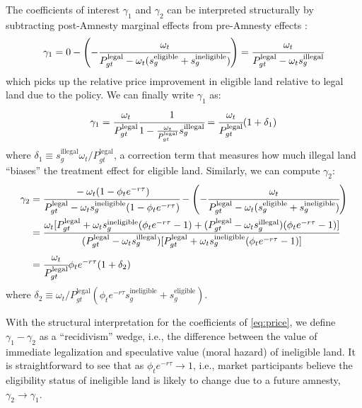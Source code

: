 \documentclass[12pt]{article}
\newcommand{\PTR}[1]{{\color{blue}{#1}}}
\begin{document}
\quad The coefficients of interest $\gamma_1$ and $\gamma_2$ can be interpreted structurally by subtracting post-Amnesty marginal effects from pre-Amnesty effects \PTR{re-write in potential outcomes formulation (average/expectation) - now it's in granular treatment assignment language (with the g's)}:
\begin{equation*}
  \gamma_1=0-\left(-\cfrac{\omega_t}{P_{gt}^\text{legal}-\omega_t(s_g^\text{eligible}+s_g^\text{ineligible})}\right)  =\cfrac{\omega_t}{P_{gt}^\text{legal}-\omega_t s_g^\text{illegal} }
\end{equation*}
which picks up the relative price improvement in eligible land relative to legal land due to the policy. We can finally write $\gamma_1$ as:
\begin{equation}
  \gamma_1=\cfrac{\omega_t}{P_{gt}^\text{legal}}\cfrac{1}{1-\frac{\omega_t}{P_{gt}^\text{legal}}s_g^\text{illegal}} =\cfrac{\omega_t}{P_{gt}^\text{legal}}(1+\delta_1) \label{eq:gamma1}
\end{equation}
where $\delta_1\equiv s_g^\text{illegal}\omega_t/P_{gt}^\text{legal}$, a correction term that measures how much illegal land ``biases'' the treatment effect for eligible land.  Similarly, we can compute $\gamma_2$:
\begin{align}
  \gamma_2 &=  \cfrac{-\omega_t(1-\phi_t e^{-r\tau})}{P_{gt}^{\text{legal}}-\omega_ts_g^\text{ineligible}(1-\phi_t e^{-r\tau})} - \left(-\cfrac{\omega_t}{P_{gt}^\text{legal}-\omega_t(s_g^\text{eligible}+s_g^\text{ineligible})}\right) \notag \\
  &=\cfrac{\omega_t[P_{gt}^\text{legal}+\omega_ts_g^\text{ineligible}(\phi_te^{-r\tau}-1)+(P_{gt}^\text{legal}-\omega_ts_g^\text{illegal})(\phi_te^{-r\tau}-1) ]}{(P_{gt}^\text{legal}-\omega_ts_g^\text{illegal})[P_{gt}^\text{legal}+\omega_t s_g^\text{ineligible}(\phi_te^{-r\tau}-1)] } \notag \\ 
  &=\cfrac{\omega_t}{P_{gt}^\text{legal}}\phi_te^{-r\tau}(1+\delta_2)
\end{align}
where $\delta_2\equiv \omega_t/P_{gt}^\text{legal}(\phi_te^{-r\tau}s_g^\text{ineligible}+s_g^\text{eligible})$. 
\ 

\quad With the structural interpretation for the coefficients of \eqref{eq:price}, we define $\gamma_1-\gamma_2$ as a ``recidivism'' wedge, i.e., the difference between the value of immediate legalization and speculative value (moral hazard) of ineligible land. It is straightforward to see that as $\phi_te^{-r\tau}\longrightarrow1$, i.e., market participants believe the eligibility status of ineligible land is likely to change due to a future amnesty, $\gamma_2\longrightarrow\gamma_1$.
\
\end{document}
